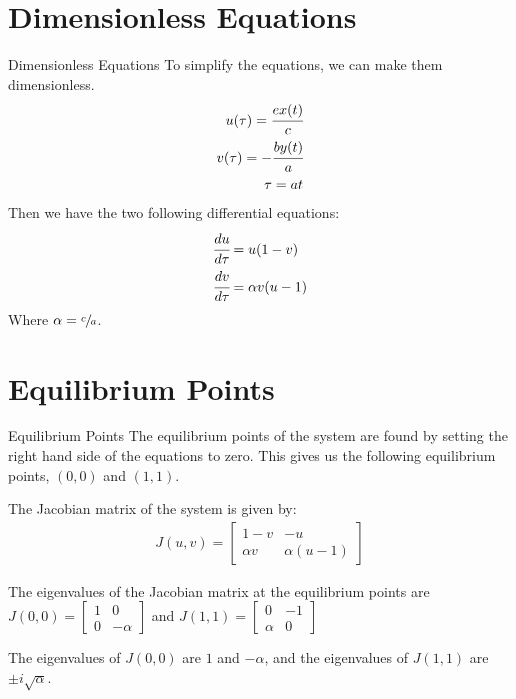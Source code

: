 \documentclass[10pt]{beamer}
\begin{document}
\section{Dimensionless Equations}
\begin{frame}{Dimensionless Equations}
    To simplify the equations, we can make them dimensionless.
    \begin{align*}
        u (\tau) = \cfrac{ex(t)}{c}  \\
        v (\tau) = -\cfrac{by(t)}{a} \\
        \tau = at
    \end{align*}
    Then we have the two following differential equations:
    \begin{align}
        \cfrac{du}{d\tau} & = u(1 - v)      \\
        \cfrac{dv}{d\tau} & = \alpha v(u-1)
    \end{align}
    Where $\alpha = \sfrac[diagonal]{c}{a}$.
\end{frame}

\section{Equilibrium Points}
\begin{frame}{Equilibrium Points}
    The equilibrium points of the system are found by setting the right hand
    side of the equations to zero. This gives us the following equilibrium
    points, $(0, 0)$ and $(1, 1)$.

    The Jacobian matrix of the system is given by:
    \begin{align*}
        J(u, v) = \begin{bmatrix}
                      1-v      & -u          \\
                      \alpha v & \alpha(u-1)
                  \end{bmatrix}
    \end{align*}

    The eigenvalues of the Jacobian matrix at the equilibrium points are
    $J(0, 0) = \begin{bmatrix}
            1 & 0       \\
            0 & -\alpha
        \end{bmatrix}$ and $J(1, 1) = \begin{bmatrix}
            0      & -1 \\
            \alpha & 0
        \end{bmatrix}$

    The eigenvalues of $J(0, 0)$ are $1$ and $-\alpha$, and the eigenvalues of
    $J(1, 1)$ are $\pm i\sqrt{\alpha}$.
\end{frame}
\end{document}
